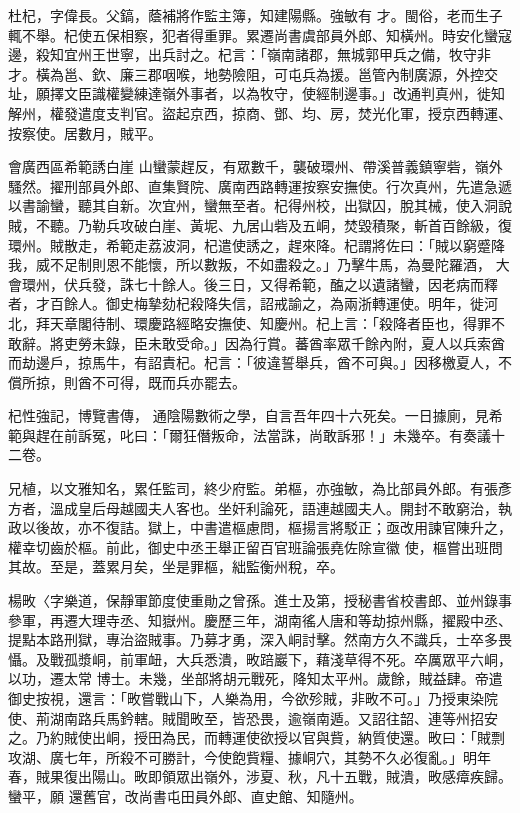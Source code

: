 \begin{pinyinscope}
 杜杞，字偉長。父鎬，蔭補將作監主簿，知建陽縣。強敏有
 才。閩俗，老而生子輒不舉。杞使五保相察，犯者得重罪。累遷尚書虞部員外郎、知橫州。時安化蠻寇邊，殺知宜州王世寧，出兵討之。杞言：「嶺南諸郡，無城郭甲兵之備，牧守非才。橫為邕、欽、廉三郡咽喉，地勢險阻，可屯兵為援。邕管內制廣源，外控交址，願擇文臣識權變練達嶺外事者，以為牧守，使經制邊事。」改通判真州，徙知解州，權發遣度支判官。盜起京西，掠商、鄧、均、房，焚光化軍，授京西轉運、按察使。居數月，賊平。



 會廣西區希範誘白崖
 山蠻蒙趕反，有眾數千，襲破環州、帶溪普義鎮寧砦，嶺外騷然。擢刑部員外郎、直集賢院、廣南西路轉運按察安撫使。行次真州，先遣急遞以書諭蠻，聽其自新。次宜州，蠻無至者。杞得州校，出獄囚，脫其械，使入洞說賊，不聽。乃勒兵攻破白崖、黃坭、九居山砦及五峒，焚毀積聚，斬首百餘級，復環州。賊散走，希範走荔波洞，杞遣使誘之，趕來降。杞謂將佐曰：「賊以窮蹙降我，威不足制則恩不能懷，所以數叛，不如盡殺之。」乃擊牛馬，為曼陀羅酒，
 大會環州，伏兵發，誅七十餘人。後三日，又得希範，醢之以遺諸蠻，因老病而釋者，才百餘人。御史梅摯劾杞殺降失信，詔戒諭之，為兩浙轉運使。明年，徙河北，拜天章閣待制、環慶路經略安撫使、知慶州。杞上言：「殺降者臣也，得罪不敢辭。將吏勞未錄，臣未敢受命。」因為行賞。蕃酋率眾千餘內附，夏人以兵索酋而劫邊戶，掠馬牛，有詔責杞。杞言：「彼違誓舉兵，酋不可與。」因移檄夏人，不償所掠，則酋不可得，既而兵亦罷去。



 杞性強記，博覽書傳，
 通陰陽數術之學，自言吾年四十六死矣。一日據廁，見希範與趕在前訴冤，叱曰：「爾狂僭叛命，法當誅，尚敢訴邪！」未幾卒。有奏議十二卷。



 兄植，以文雅知名，累任監司，終少府監。弟樞，亦強敏，為比部員外郎。有張彥方者，溫成皇后母越國夫人客也。坐奸利論死，語連越國夫人。開封不敢窮治，執政以後故，亦不復詰。獄上，中書遣樞慮問，樞揚言將駁正；亟改用諫官陳升之，權幸切齒於樞。前此，御史中丞王舉正留百官班論張堯佐除宣徽
 使，樞嘗出班問其故。至是，蓋累月矣，坐是罪樞，絀監衡州稅，卒。



 楊畋〈字樂道，保靜軍節度使重勛之曾孫。進士及第，授秘書省校書郎、並州錄事參軍，再遷大理寺丞、知嶽州。慶歷三年，湖南徭人唐和等劫掠州縣，擢殿中丞、提點本路刑獄，專治盜賊事。乃募才勇，深入峒討擊。然南方久不識兵，士卒多畏懾。及戰孤漿峒，前軍衄，大兵悉潰，畋踣巖下，藉淺草得不死。卒厲眾平六峒，以功，遷太常
 博士。未幾，坐部將胡元戰死，降知太平州。歲餘，賊益肆。帝遣御史按視，還言：「畋嘗戰山下，人樂為用，今欲殄賊，非畋不可。」乃授東染院使、荊湖南路兵馬鈐轄。賊聞畋至，皆恐畏，逾嶺南遁。又詔往韶、連等州招安之。乃約賊使出峒，授田為民，而轉運使欲授以官與貲，納質使還。畋曰：「賊剽攻湖、廣七年，所殺不可勝計，今使飽貲糧、據峒穴，其勢不久必復亂。」明年春，賊果復出陽山。畋即領眾出嶺外，涉夏、秋，凡十五戰，賊潰，畋感瘴疾歸。蠻平，願
 還舊官，改尚書屯田員外郎、直史館、知隨州。




\end{pinyinscope}
